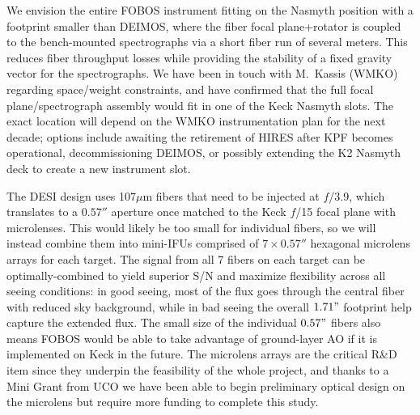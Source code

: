 \documentclass[10pt,letterpaper]{article}
\begin{document}
We envision the entire FOBOS instrument fitting on the Nasmyth position with
a footprint smaller than DEIMOS, where the fiber focal plane+rotator is coupled to the bench-mounted
spectrographs via a short fiber run of several meters. This reduces fiber throughput losses while providing the stability of a fixed
gravity vector for the spectrographs.
We have been in touch with M.\ Kassis (WMKO) regarding space/weight constraints, and have confirmed that the 
full focal plane/spectrograph assembly would fit in one of the Keck Nasmyth slots.
The exact location will depend on the WMKO instrumentation plan for the next decade; options include
awaiting the retirement of HIRES after KPF becomes operational, 
decommissioning DEIMOS, or possibly extending the K2 Nasmyth deck to create a new instrument slot.

The DESI design uses 107$\mu$m fibers that need to be injected at $f$/3.9, which translates to
a $0.57''$ aperture once matched to the Keck $f$/15 focal plane with microlenses.
This would likely be too small for individual fibers, so we will instead combine them into mini-IFUs
comprised of $7\times0.57''$
hexagonal microlens arrays for each target.
The signal from all 7 fibers on each target
can be optimally-combined to yield superior S/N and maximize flexibility
across all seeing conditions: in good seeing, 
most of the flux goes through the central fiber with reduced sky background,
while in bad seeing the overall $1.71"$ footprint help capture the extended flux. 
The small size of the individual $0.57"$ fibers also means FOBOS would be able to take advantage of 
ground-layer AO if it is implemented on Keck in the future. 
The microlens arrays are the critical R\&D item since they underpin the feasibility of the whole project, 
and thanks to a Mini Grant from UCO we have been able to begin preliminary optical design on the microlens
but require more funding to complete this study.
\end{document}
